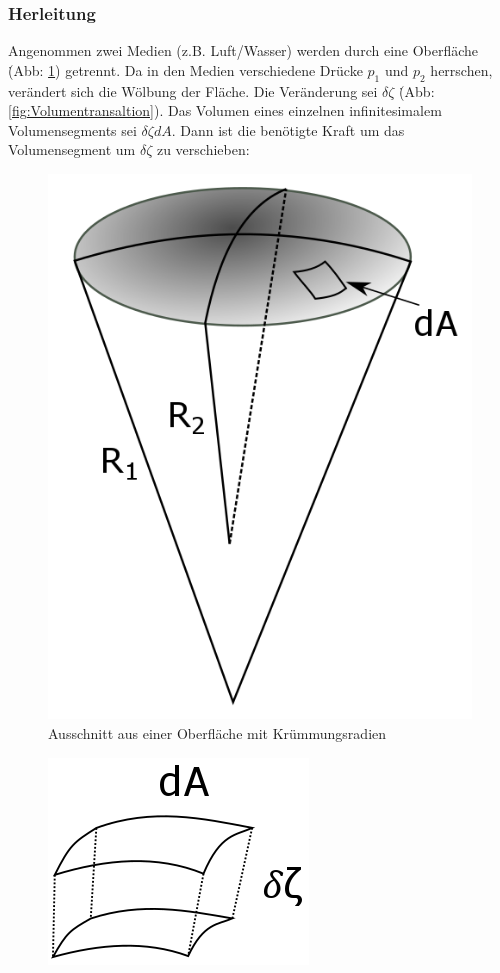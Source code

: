 \begin{refsection}
\subsubsection{Herleitung}\label{YL-Herleitung}
Angenommen zwei Medien (z.B. Luft/Wasser) werden durch eine Oberfläche \. (Abb: \ref{fig:YoungCone}) getrennt. Da in den Medien verschiedene Drücke $p_1$ und $p_2$ herrschen, verändert sich die Wölbung der Fläche. Die Veränderung sei $\delta \zeta$ \.(Abb: \ref{fig:Volumentransaltion}). Das Volumen eines einzelnen infinitesimalem Volumensegments sei $\delta \zeta dA$. Dann ist die benötigte Kraft um das Volumensegment um $\delta\zeta$ zu verschieben:
\begin{figure}
  \centering
  \includegraphics[scale=0.3]{minimal/YoungCone.png}
  \caption{Ausschnitt aus einer Oberfläche mit Krümmungsradien} 
  \label{fig:YoungCone}
\end{figure}
\begin{figure}
  \centering
  \includegraphics[scale=0.3]{minimal/Volumetranslation.png}

\end{figure}
\end{refsection}
